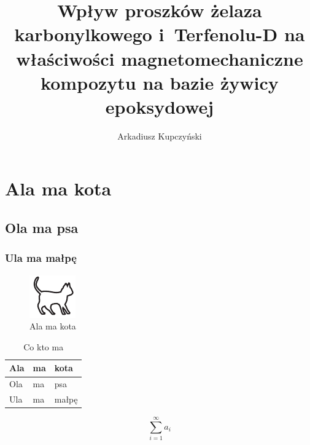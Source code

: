 \documentclass[12pt,openany,doublesided]{mwrep}
\author{Arkadiusz Kupczyński}
\title{Wpływ proszków żelaza karbonylkowego i~Terfenolu-D na właściwości magnetomechaniczne kompozytu na bazie żywicy epoksydowej}
\begin{document}
\maketitle

\tableofcontents

\listoffigures

\listoftables


\chapter{Ala ma kota}

\lipsum[1]

\section{Ola ma psa}

\lipsum[2-3]

\subsection{Ula ma małpę}

\lipsum[4-10]

\begin{figure}
\includegraphics[width=.4\textwidth]{kotek}
\caption{Ala ma kota}
\end{figure}

\lipsum[11-15]

\begin{table}
\caption{Co kto ma \cite{harel_rzecz_2008}}
\begin{tabular}{|l|l|l|}
\hline
Ala & ma & kota \\
\hline
Ola & ma & psa \\
\hline
Ula & ma & małpę\\
\hline
\end{tabular}
\end{table}

\lipsum[16-20]

\begin{equation}
\sum_{i=1}^{\infty}a_i
\end{equation}

\nocite{*}


\end{document}
